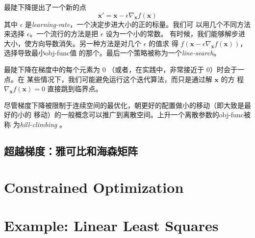 最陡下降提出了一个新的点
\begin{equation}
  \pmb{x}' = \pmb{x} - \epsilon\nabla_{\pmb{x}}f(\pmb{x})
\end{equation}
其中 $\epsilon$ 是\emph{\gls{learning-rate}}，一个决定步进大小的正的标量。我们可
以用几个不同方法来选择 $\epsilon$。一个流行的方法是把 $\epsilon$ 设为一个小的常数。
有时候，我们能够解步进大小，使方向导数消失。另一种方法是对几个 $\epsilon$ 的值求
得
$f(\pmb{x} - \epsilon\nabla_{\pmb{x}}f(\pmb{x}))$，选择导致最小\gls*{obj-func}值
的那个。最后一个策略被称为一个\emph{\gls{line-search}}。

最陡下降在梯度中的每个元素为 $0$ （或者，在实践中，非常接近于 $0$）时会于一点。在
某些情况下，我们可能避免运行这个迭代算法，而只是通过解 $\pmb{x}$ 的方
程 $\nabla_{\pmb{x}}f(\pmb{x}) = 0$ 直接跳到临界点。

尽管梯度下降被限制于连续空间的最优化，朝更好的配置做小的移动（即大致是最好的小的
移动）的一般概念可以推广到离散空间。上升一个离散参数的\gls*{obj-func}被称
为\emph{\gls{hill-climbing}} \citep{Russel+Norvig-book2003}。

\subsection{超越梯度：雅可比和海森矩阵}
\label{subsec:beyong_the_gradient}

\section{Constrained Optimization}
\label{sec:constrained_optimization}

\section{Example: Linear Least Squares}
\label{sec:example:linear_least_squares}
